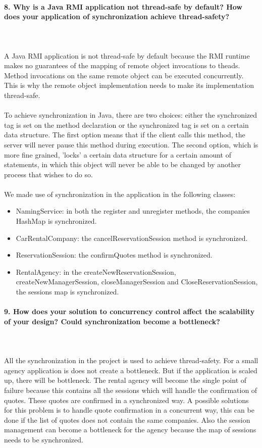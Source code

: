 \documentclass{ds-report}
\begin{document}
	\paragraph{8. Why is a Java RMI application not thread-safe by default? How does your application of synchronization achieve thread-safety?} \mbox{}\\\\
A Java RMI application is not thread-safe by default because the RMI runtime makes no guarantees of the mapping of remote object invocations to theads. Method invocations on the same remote object can be executed concurrently. This is why the remote object implementation needs to make its implementation thread-safe.\\\\
To achieve synchronization in Java, there are two choices: either the synchronized tag is set on the method declaration or the synchronized tag is set on a certain data structure. The first option means that if the client calls this method, the server will never pause this method during execution. The second option, which is more fine grained, 'locks' a certain data structure for a certain amount of statements, in which this object will never be able to be changed by another process that wishes to do so.\\\\
We made use of synchronization in the application in the following classes:
\begin{itemize}
	\item NamingService: in both the register and unregister methods, the companies HashMap is synchronized. 
	\item CarRentalCompany: the cancelReservationSession method is synchronized.
	\item ReservationSession: the confirmQuotes method is synchronized.
	\item RentalAgency: in the createNewReservationSession, createNewManagerSession, closeManagerSession and CloseReservationSession, the sessions map is synchronized.
\end{itemize} 


	\paragraph{9. How does your solution to concurrency control affect the scalability of your design? Could synchronization become a bottleneck?} \mbox{}\\\\
All the synchronization in the project is used to achieve thread-safety. For a small agency application is does not create a bottleneck. But if the application is scaled up, there will be bottleneck. The rental agency will become the single point of failure because this contains all the sessions which will handle the confirmation of quotes. These quotes are confirmed in a synchronized way. A possible solutions for this problem is to handle quote confirmation in a concurrent way, this can be done if the list of quotes does not contain the same companies. Also the session management can become a bottleneck for the agency because the map of sessions needs to be synchronized.

	
	\clearpage
	
	
\end{document}
